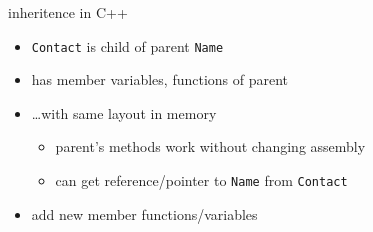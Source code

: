 \begin{frame}{inheritence in C++}
    \begin{itemize}
    \item \texttt{Contact} is child of parent \texttt{Name}
    \item has member variables, functions of parent
    \item \ldots with same layout in memory
        \begin{itemize}
        \item parent's methods work without changing assembly
        \item can get reference/pointer to \texttt{Name} from \texttt{Contact}
        \end{itemize}
    \item add new member functions/variables
    \end{itemize}
\end{frame}


